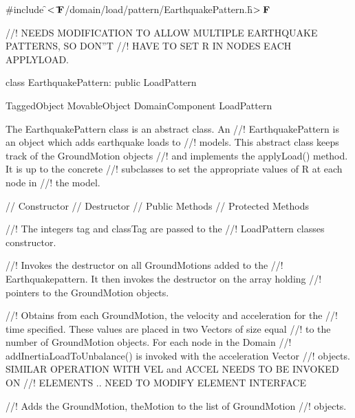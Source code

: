 
\indent \#include \f$<\tilde{ }{\bf F}$/domain/load/pattern/EarthquakePattern.h\f$>{\bf F}$

//! NEEDS MODIFICATION TO ALLOW MULTIPLE EARTHQUAKE PATTERNS, SO DON''T
//! HAVE TO SET R IN NODES EACH APPLYLOAD.

\indent class EarthquakePattern: public LoadPattern

\indent TaggedObject
\indent MovableObject
\indent\indent DomainComponent
\indent\indent\indent LoadPattern
\indent\indent\indent{}

\indent The EarthquakePattern class is an abstract class. An
//! EarthquakePattern is an object which adds earthquake loads to
//! models. This abstract class keeps track of the GroundMotion objects
//! and implements the applyLoad() method. It is up to the concrete
//! subclasses to set the appropriate values of \p R at each node in
//! the model.

\indent // Constructor 
\indent // Destructor 
\indent // Public Methods 
\indent // Protected Methods

//! The integers \p tag and \p classTag are passed to the
//! LoadPattern classes constructor.

//! Invokes the destructor on all GroundMotions added to the
//! Earthquakepattern. It then invokes the destructor on the array holding
//! pointers to the GroundMotion objects.

//! Obtains from each GroundMotion, the velocity and acceleration for the
//! time specified. These values are placed in two Vectors of size equal
//! to the number of GroundMotion objects. For each node in the Domain
//! addInertiaLoadToUnbalance() is invoked with the acceleration Vector
//! objects. SIMILAR OPERATION WITH VEL and ACCEL NEEDS TO BE INVOKED ON
//! ELEMENTS .. NEED TO MODIFY ELEMENT INTERFACE

//! Adds the GroundMotion, \p theMotion to the list of GroundMotion
//! objects.
